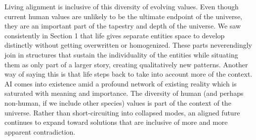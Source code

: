 \documentclass[12pt]{article}
\begin{document}

Living alignment is inclusive of this diversity of evolving values. Even though current human values are unlikely to be the ultimate endpoint of the universe, they are an important part of the tapestry and depth of the universe. We saw consistently in Section 1 that life gives separate entities space to develop distinctly without getting overwritten or homogenized. These parts neverendingly join in structures that sustain the individuality of the entities while situating them as only part of a larger story, creating qualitatively new patterns. Another way of saying this is that life steps back to take into account more of the context. AI comes into existence amid a profound network of existing reality which is saturated with meaning and importance. The diversity of human (and perhaps non-human, if we include other species) values is part of the context of the universe. Rather than short-circuiting into collapsed modes, an aligned future continues to expand toward solutions that are inclusive of more and more apparent contradiction. 





\end{document}
